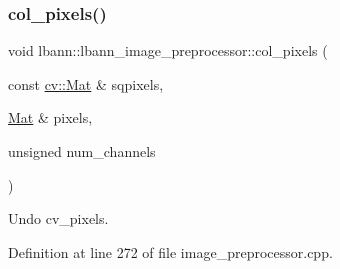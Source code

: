 \mbox{\label{classlbann_1_1lbann__image__preprocessor_a3e99be32b95a415fd8d616cb85075df1}} 
\subsubsection{\texorpdfstring{col\+\_\+pixels()}{col\_pixels()}}
{\footnotesize\ttfamily void lbann\+::lbann\+\_\+image\+\_\+preprocessor\+::col\+\_\+pixels (\begin{DoxyParamCaption}\item[{const \hyperlink{base_8hpp_a68f11fdc31b62516cb310831bbe54d73}{cv\+::\+Mat} \&}]{sqpixels,  }\item[{\hyperlink{base_8hpp_a68f11fdc31b62516cb310831bbe54d73}{Mat} \&}]{pixels,  }\item[{unsigned}]{num\+\_\+channels }\end{DoxyParamCaption})\hspace{0.3cm}{\ttfamily [protected]}}

Undo cv\+\_\+pixels. 

Definition at line 272 of file image\+\_\+preprocessor.\+cpp.


